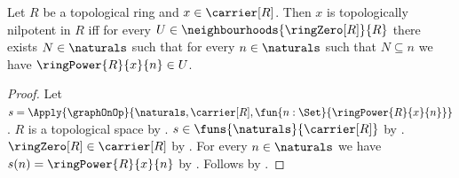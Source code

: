 \begin{theorem}\label{topologically_nilpotent_iff_eventually_in_neighbourhoods}
    Let $R$ be a topological ring and $x\in\carrier[R]$.
    Then $x$ is topologically nilpotent in $R$ iff
        for every $U\in\neighbourhoods{\ringZero[R]}{R}$ there exists
            $N\in\naturals$ such that for every $n\in\naturals$ such that
            $N\subseteq n$ we have $\ringPower{R}{x}{n}\in U$.
\end{theorem}
\begin{proof}
    Let $s=\Apply{\graphOnOp}{
        \naturals,\carrier[R],
        \fun{n:\Set}{\ringPower{R}{x}{n}}}$.
    $R$ is a topological space by
        .
    $s\in\funs{\naturals}{\carrier[R]}$ by
        .
    $\ringZero[R]\in\carrier[R]$ by
        .
    For every $n\in\naturals$ we have
        $s(n)=\ringPower{R}{x}{n}$ by
        .
    Follows by
        .
\end{proof}

